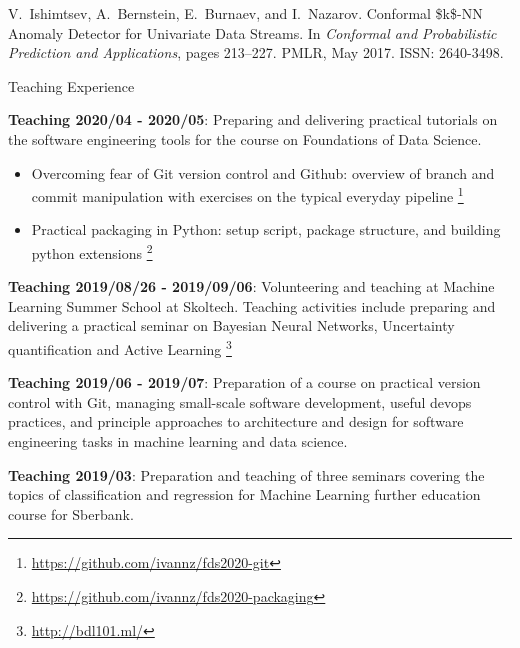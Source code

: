 \documentclass{resume} %
\begin{document}
{\begin{thebibliography}{10}
V.~Ishimtsev, A.~Bernstein, E.~Burnaev, and I.~Nazarov.
\newblock Conformal \$k\$-{NN} {Anomaly} {Detector} for {Univariate} {Data}
  {Streams}.
\newblock In \emph{Conformal and {Probabilistic} {Prediction} and
  {Applications}}, pages 213--227. PMLR, May 2017.
\newblock ISSN: 2640-3498.

\end{thebibliography}

}

\bigskip
\begin{rSection}{Teaching Experience}
    \item \textbf{Teaching 2020/04 - 2020/05}:
    Preparing and delivering practical tutorials on the software engineering tools for the
    course on Foundations of Data Science.
    \begin{itemize}
        \item Overcoming fear of Git version control and Github: overview of branch and
        commit manipulation with exercises on the typical everyday pipeline%
            \footnote{\url{https://github.com/ivannz/fds2020-git}}

        \item Practical packaging in Python: setup script, package structure, and building
        python extensions%
            \footnote{\url{https://github.com/ivannz/fds2020-packaging}}
    \end{itemize}

    \medskip
    \item \textbf{Teaching 2019/08/26 - 2019/09/06}:
    Volunteering and teaching at Machine Learning Summer School at Skoltech. Teaching
    activities include preparing and delivering a practical seminar on Bayesian Neural
    Networks, Uncertainty quantification and Active Learning
        \footnote{\url{http://bdl101.ml/}}

    \medskip
    \item \textbf{Teaching 2019/06 - 2019/07}:
    Preparation of a course on practical version control with Git, managing small-scale software
    development, useful devops practices, and principle approaches to architecture and design for
    software engineering tasks in machine learning and data science.

    \medskip
    \item \textbf{Teaching 2019/03}:
    Preparation and teaching of three seminars covering the topics of classification and regression
    for Machine Learning further education course for Sberbank.


\end{rSection}
\end{document}

